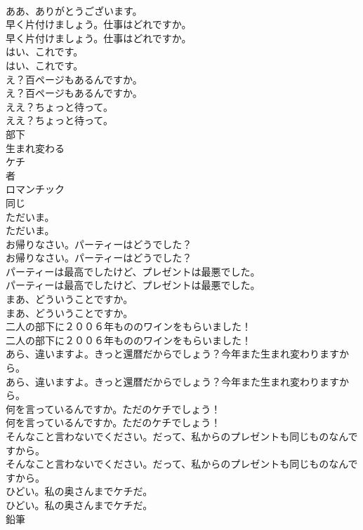 \documentclass[8pt]{extreport}
\begin{document}
\begin{CJK}{UTF8}{min}
\\	ああ、ありがとうございます。 
\\	早く片付けましょう。仕事はどれですか。	
\\	早く片付けましょう。仕事はどれですか。 
\\	はい、これです。	
\\	はい、これです。 
\\	え？百ページもあるんですか。	
\\	え？百ページもあるんですか。 
\\	ええ？ちょっと待って。	
\\	ええ？ちょっと待って。 
\\	部下
\\	生まれ変わる
\\	ケチ
\\	者
\\	ロマンチック
\\	同じ
\\	ただいま。	
\\	ただいま。 
\\	お帰りなさい。パーティーはどうでした？	
\\	お帰りなさい。パーティーはどうでした？ 
\\	パーティーは最高でしたけど、プレゼントは最悪でした。	
\\	パーティーは最高でしたけど、プレゼントは最悪でした。 
\\	まあ、どういうことですか。	
\\	まあ、どういうことですか。 
\\	二人の部下に２００６年もののワインをもらいました！	
\\	二人の部下に２００６年もののワインをもらいました！ 
\\	あら、違いますよ。きっと還暦だからでしょう？今年また生まれ変わりますから。	
\\	あら、違いますよ。きっと還暦だからでしょう？今年また生まれ変わりますから。 
\\	何を言っているんですか。ただのケチでしょう！	
\\	何を言っているんですか。ただのケチでしょう！ 
\\	そんなこと言わないでください。だって、私からのプレゼントも同じものなんですから。	
\\	そんなこと言わないでください。だって、私からのプレゼントも同じものなんですから。 
\\	ひどい。私の奥さんまでケチだ。	
\\	ひどい。私の奥さんまでケチだ。 
\\	鉛筆

\end{CJK}
\end{document}
